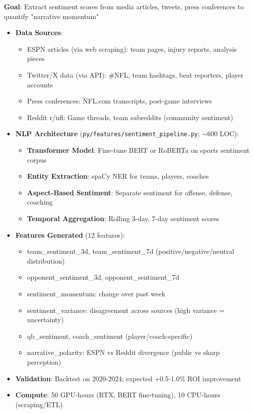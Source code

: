 \textbf{Goal}: Extract sentiment scores from media articles, tweets, press conferences to quantify "narrative momentum"

\begin{itemize}
  \item {} \textbf{Data Sources}:
  \begin{itemize}
    \item ESPN articles (via web scraping): team pages, injury reports, analysis pieces
    \item Twitter/X data (via API): \#NFL, team hashtags, beat reporters, player accounts
    \item Press conferences: NFL.com transcripts, post-game interviews
    \item Reddit r/nfl: Game threads, team subreddits (community sentiment)
  \end{itemize}
  \item {} \textbf{NLP Architecture} (\texttt{py/features/sentiment\_pipeline.py}; $\sim$600 LOC):
  \begin{itemize}
    \item \textbf{Transformer Model}: Fine-tune BERT or RoBERTa on sports sentiment corpus
    \item \textbf{Entity Extraction}: spaCy NER for teams, players, coaches
    \item \textbf{Aspect-Based Sentiment}: Separate sentiment for offense, defense, coaching
    \item \textbf{Temporal Aggregation}: Rolling 3-day, 7-day sentiment scores
  \end{itemize}
  \item {} \textbf{Features Generated} (12 features):
  \begin{itemize}
    \item team\_sentiment\_3d, team\_sentiment\_7d (positive/negative/neutral distribution)
    \item opponent\_sentiment\_3d, opponent\_sentiment\_7d
    \item sentiment\_momentum: change over past week
    \item sentiment\_variance: disagreement across sources (high variance = uncertainty)
    \item qb\_sentiment, coach\_sentiment (player/coach-specific)
    \item narrative\_polarity: ESPN vs Reddit divergence (public vs sharp perception)
  \end{itemize}
  \item {} \textbf{Validation}: Backtest on 2020-2024; expected +0.5-1.0\% ROI improvement
  \item \textbf{Compute}: 50 GPU-hours (RTX, BERT fine-tuning), 10 CPU-hours (scraping/ETL)
\end{itemize}

